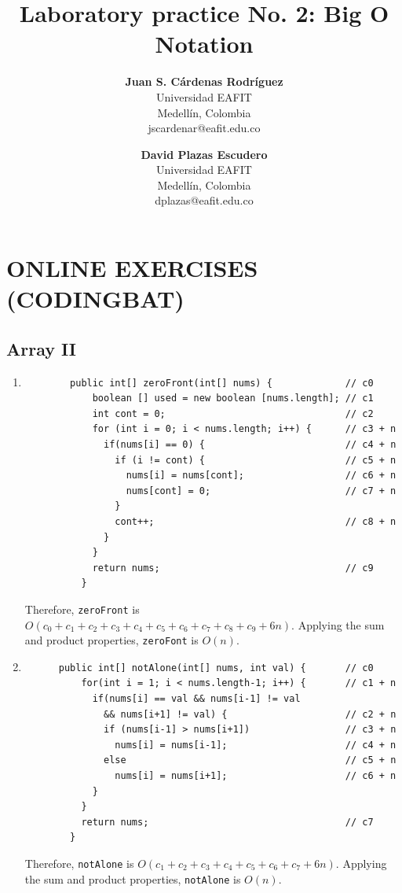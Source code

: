\documentclass[a4paper,12pt]{article}
\title{\color{Eblue}\textbf{Laboratory practice No. 2: Big O Notation}}
\author{
  \textbf{Juan S. Cárdenas Rodríguez}\\
  Universidad EAFIT\\
  Medellín, Colombia\\
  jscardenar@eafit.edu.co
\and
  \textbf{David Plazas Escudero}\\
  Universidad EAFIT\\
  Medellín, Colombia\\
  dplazas@eafit.edu.co
}
\begin{document}
  \maketitle
  \thispagestyle{fancy}

  \section{ONLINE EXERCISES (CODINGBAT)}
  \subsection{Array II}
    \begin{enumerate}
      \item \begin{Verbatim}
        public int[] zeroFront(int[] nums) {             // c0
            boolean [] used = new boolean [nums.length]; // c1
            int cont = 0;                                // c2
            for (int i = 0; i < nums.length; i++) {      // c3 + n
              if(nums[i] == 0) {                         // c4 + n
                if (i != cont) {                         // c5 + n
                  nums[i] = nums[cont];                  // c6 + n
                  nums[cont] = 0;                        // c7 + n
                }
                cont++;                                  // c8 + n
              }
            }
            return nums;                                 // c9
          }
      \end{Verbatim}
      Therefore, \texttt{zeroFront} is $O(c_0+c_1+c_2+c_3+c_4+c_5+c_6+c_7+c_8+c_9+6n)$.
      Applying the sum and product properties, \texttt{zeroFont} is $O(n)$.

      \item \begin{Verbatim}
      public int[] notAlone(int[] nums, int val) {       // c0
          for(int i = 1; i < nums.length-1; i++) {       // c1 + n
            if(nums[i] == val && nums[i-1] != val
              && nums[i+1] != val) {                     // c2 + n
              if (nums[i-1] > nums[i+1])                 // c3 + n
                nums[i] = nums[i-1];                     // c4 + n
              else                                       // c5 + n
                nums[i] = nums[i+1];                     // c6 + n
            }
          }
          return nums;                                   // c7
        }
    \end{Verbatim}
    Therefore, \texttt{notAlone} is $O(c_1+c_2+c_3+c_4+c_5+c_6+c_7+6n)$.
    Applying the sum and product properties, \texttt{notAlone} is $O(n)$.


\end{enumerate}
\end{document}
